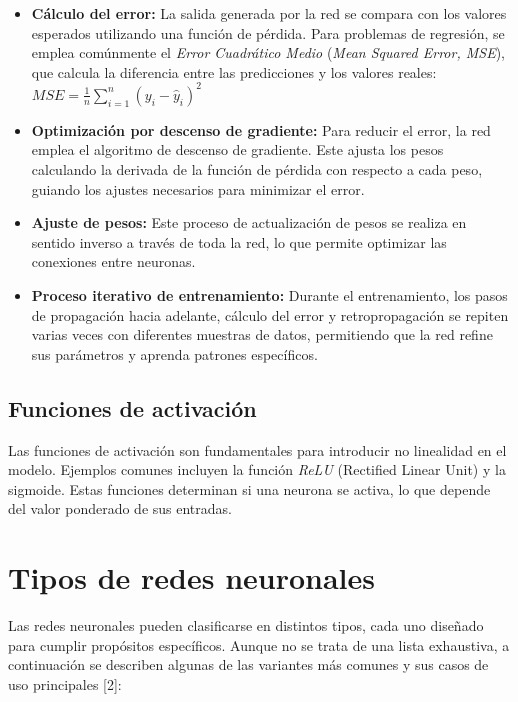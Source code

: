 \begin{itemize}
	\item \textbf{Cálculo del error:} La salida generada por la red se compara con los valores esperados utilizando una función de pérdida. Para problemas de regresión, se emplea comúnmente el \textit{Error Cuadrático Medio} (\textit{Mean Squared Error, MSE}), que calcula la diferencia entre las predicciones y los valores reales:  
	$ {MSE} = \frac{1}{n} \sum_{i=1}^{n} (y_i - \hat{y}_i)^2 $
	
	\item \textbf{Optimización por descenso de gradiente:} Para reducir el error, la red emplea el algoritmo de descenso de gradiente. Este ajusta los pesos calculando la derivada de la función de pérdida con respecto a cada peso, guiando los ajustes necesarios para minimizar el error.  
	
	\item \textbf{Ajuste de pesos:} Este proceso de actualización de pesos se realiza en sentido inverso a través de toda la red, lo que permite optimizar las conexiones entre neuronas.  
	
	\item \textbf{Proceso iterativo de entrenamiento:} Durante el entrenamiento, los pasos de propagación hacia adelante, cálculo del error y retropropagación se repiten varias veces con diferentes muestras de datos, permitiendo que la red refine sus parámetros y aprenda patrones específicos.
\end{itemize}


\subsection{Funciones de activación}
Las funciones de activación son fundamentales para introducir no linealidad en el modelo. Ejemplos comunes incluyen la función \textit{ReLU} (Rectified Linear Unit) y la sigmoide. Estas funciones determinan si una neurona se activa, lo que depende del valor ponderado de sus entradas.


\section{Tipos de redes neuronales}

Las redes neuronales pueden clasificarse en distintos tipos, cada uno diseñado para cumplir propósitos específicos. Aunque no se trata de una lista exhaustiva, a continuación se describen algunas de las variantes más comunes y sus casos de uso principales [2]:


